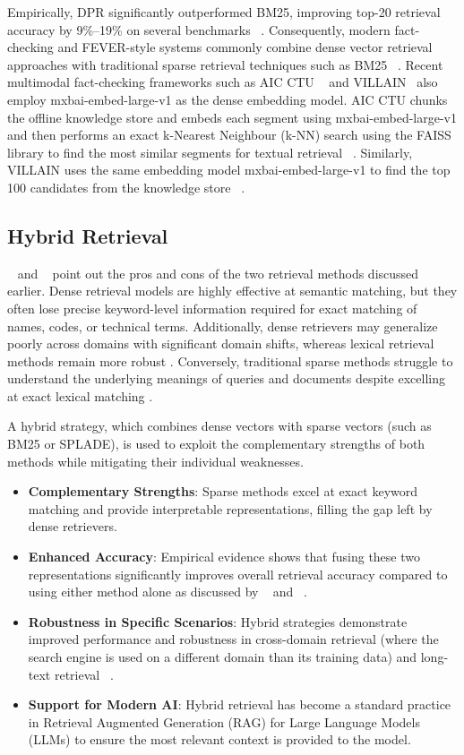 Empirically, DPR significantly outperformed BM25, improving top-20 retrieval accuracy by 9\%–19\% on several benchmarks ~\citep{Karpukhin2020Nov}. Consequently, modern fact-checking and FEVER-style systems commonly combine dense vector retrieval approaches with traditional sparse retrieval techniques such as BM25 ~\citet{Schlichtkrull2024Nov}. Recent multimodal fact-checking frameworks such as AIC CTU ~\cite{Ullrich2026Mar} and VILLAIN~\cite{Jung2026Mar} also employ mxbai-embed-large-v1 as the dense embedding model. AIC CTU chunks the offline knowledge store and embeds each segment using  mxbai-embed-large-v1 and then performs an exact k-Nearest Neighbour (k-NN) search using the FAISS library to find the most similar segments for textual retrieval ~\cite{Ullrich2026Mar}. Similarly, VILLAIN uses the same embedding model mxbai-embed-large-v1 to find the top 100 candidates from the knowledge store ~\cite{Jung2026Mar}.

\subsection{Hybrid Retrieval}

~\citet{Chen2022Jan} and ~\citet{Gao2020Apr} point out the pros and cons of the two retrieval methods discussed earlier. Dense retrieval models are highly effective at semantic matching, but they often lose precise keyword-level information required for exact matching of names, codes, or technical terms. Additionally, dense retrievers may generalize poorly across domains with significant domain shifts, whereas lexical retrieval methods remain more robust . Conversely, traditional sparse methods struggle to understand the underlying meanings of queries and documents despite excelling at exact lexical matching .

A hybrid strategy, which combines dense vectors with sparse vectors (such as BM25 or SPLADE), is used to exploit the complementary strengths of both methods while mitigating their individual weaknesses.

\begin{itemize}
    \item \textbf{Complementary Strengths}: Sparse methods excel at exact keyword matching and provide interpretable representations, filling the gap left by dense retrievers.
    \item \textbf{Enhanced Accuracy}: Empirical evidence shows that fusing these two representations significantly improves overall retrieval accuracy compared to using either method alone as discussed by ~\citet{Gao2020Apr} and ~\citet{Chen2022Jan}.
    \item \textbf{Robustness in Specific Scenarios}: Hybrid strategies demonstrate improved performance and robustness in cross-domain retrieval (where the search engine is used on a different domain than its training data) and long-text retrieval ~\cite{Luan2021}.
    \item \textbf{Support for Modern AI}: Hybrid retrieval has become a standard practice in Retrieval Augmented Generation (RAG) for Large Language Models (LLMs) to ensure the most relevant context is provided to the model.
\end{itemize}

